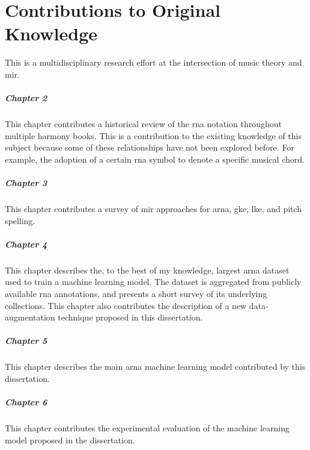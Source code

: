 \chapter*{Contributions to Original Knowledge}
\label{chap:contributionstoknowledge}

This \thesisdiss{} is a multidisciplinary research effort at
the intersection of music theory and \gls{mir}.

\paragraph{Chapter 2}

This chapter contributes a historical review of the
\gls{rna} notation throughout multiple harmony books. This
is a contribution to the existing knowledge of this subject
because some of these relationships have not been explored
before. For example, the adoption of a certain \gls{rna}
symbol to denote a specific musical chord.

\paragraph{Chapter 3}

This chapter contributes a survey of \gls{mir} approaches
for \gls{arna}, \gls{gke}, \gls{lke}, and pitch spelling. 

\paragraph{Chapter 4}

This chapter describes the, to the best of my knowledge,
largest \gls{arna} dataset used to train a machine learning
model. The dataset is aggregated from publicly available
\gls{rna} annotations, and presents a short survey of its
underlying collections. This chapter also contributes the
description of a new data-augmentation technique proposed in
this dissertation.

\paragraph{Chapter 5}

This chapter describes the main \gls{arna} machine learning
model contributed by this dissertation.

\paragraph{Chapter 6}

This chapter contributes the experimental evaluation of the
machine learning model proposed in the dissertation. 
